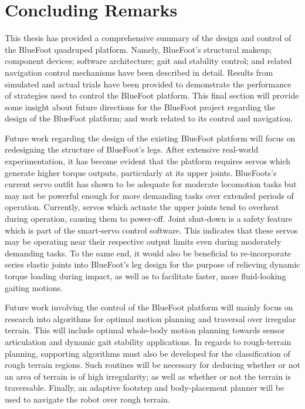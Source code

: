 \chapter{Concluding Remarks}
	\label{ch::conclusion}


	This thesis has provided a comprehensive summary of the design and control of the BlueFoot quadruped platform. Namely, BlueFoot's structural makeup; component devices; software architecture; gait and stability control; and related navigation control mechanisms have been described in detail. Results from simulated and actual trials have been provided to demonstrate the performance of strategies used to control the BlueFoot platform. This final section will provide some insight about future directions for the BlueFoot project regarding the design of the BlueFoot platform; and work related to its control and navigation.


	Future work regarding the design of the existing BlueFoot platform will focus on redesigning the structure of BlueFoot's legs. After extensive real-world experimentation, it has become evident that the platform requires servos which generate higher torque outputs, particularly at its upper joints. BlueFoots's current servo outfit has shown to be adequate for moderate locomotion tasks but may not be powerful enough for more demanding tasks over extended periods of operation. Currently, servos which actuate the upper joints tend to overheat during operation, causing them to power-off. Joint shut-down is a safety feature which is part of the smart-servo control software. This indicates that these servos may be operating near their respective output limits even during moderately demanding tasks. To the same end, it would also be beneficial to re-incorporate series elastic joints into  BlueFoot's leg design for the purpose of relieving dynamic torque loading during impact, as well as to facilitate faster, more fluid-looking gaiting motions.


	Future work involving the control of the BlueFoot platform will mainly focus on research into algorithms for optimal motion planning and traversal over irregular terrain. This will include optimal whole-body motion planning towards sensor articulation and dynamic gait stability applications. In regards to rough-terrain planning, supporting algorithms must also be developed for the classification of rough terrain regions. Such routines will be necessary for deducing whether or not an area of terrain is of high irregularity; as well as whether or not the terrain is traversable. Finally, an adaptive footstep and body-placement planner will be used to navigate the robot over rough terrain. 


